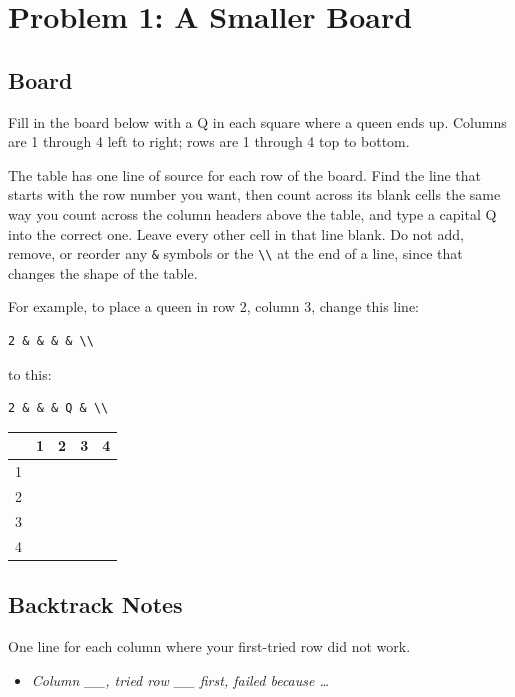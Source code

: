 \documentclass[11pt]{article}
\begin{document}
\section{Problem 1: A Smaller Board}

\subsection{Board}
Fill in the board below with a Q in each square where a queen ends up.
Columns are 1 through 4 left to right; rows are 1 through 4 top to bottom.

The table has one line of source for each row of the board. Find the line
that starts with the row number you want, then count across its blank
cells the same way you count across the column headers above the table,
and type a capital Q into the correct one. Leave every other cell in that
line blank. Do not add, remove, or reorder any \verb|&| symbols or the
\verb|\\| at the end of a line, since that changes the shape of the table.

For example, to place a queen in row 2, column 3, change this line:
\begin{lstlisting}
2 & & & & \\
\end{lstlisting}
to this:
\begin{lstlisting}
2 & & & Q & \\
\end{lstlisting}

\begin{center}
\renewcommand{\arraystretch}{1.5}
\begin{tabular}{c|c|c|c|c}
 & 1 & 2 & 3 & 4 \\
\hline
1 & & & & \\
\hline
2 & & & & \\
\hline
3 & & & & \\
\hline
4 & & & & \\
\end{tabular}
\end{center}

\subsection{Backtrack Notes}
One line for each column where your first-tried row did not work.

\begin{itemize}[leftmargin=1.4em]
  \item \textit{Column \_\_, tried row \_\_ first, failed because \ldots}
\end{itemize}
\end{document}
